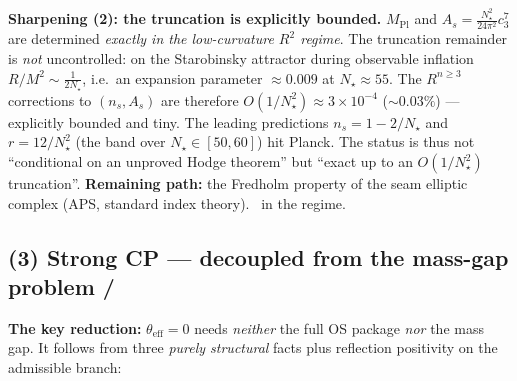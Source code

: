 \documentclass[11pt,a4paper]{article}
\theoremstyle{definition}
\begin{document}
\par\smallskip\noindent\textbf{Sharpening (2): the truncation is explicitly bounded.}
$M_{\mathrm{Pl}}$ and $A_s=\tfrac{N_\star^2}{24\pi^2}c_3^7$ are determined \emph{exactly in the
low-curvature $R^2$ regime}. The truncation remainder is \emph{not} uncontrolled: on the Starobinsky
attractor during observable inflation $R/M^2\sim\tfrac1{2N_\star}$, i.e.\ an expansion parameter
$\approx0.009$ at $N_\star\!\approx\!55$. The $R^{n\ge3}$ corrections to $(n_s,A_s)$ are therefore
$O(1/N_\star^2)\approx3\times10^{-4}$ ($\sim0.03\%$) --- explicitly bounded and tiny. The leading
predictions $n_s=1-2/N_\star$ and $r=12/N_\star^2$ (the band over $N_\star\in[50,60]$) hit Planck. The
status is thus not ``conditional on an unproved Hodge theorem'' but ``exact up to an
$O(1/N_\star^2)$ truncation''. \textbf{Remaining path:} the Fredholm property of the seam elliptic
complex (APS, standard index theory). \mE\ in the regime.

\subsection*{(3) Strong CP --- decoupled from the mass-gap problem \mE/\mC}
\textbf{The key reduction:} $\theta_{\mathrm{eff}}=0$ needs \emph{neither} the full OS package \emph{nor}
the mass gap. It follows from three \emph{purely structural} facts plus reflection positivity on the
admissible branch:

\begin{center}
\end{center}
\end{document}
